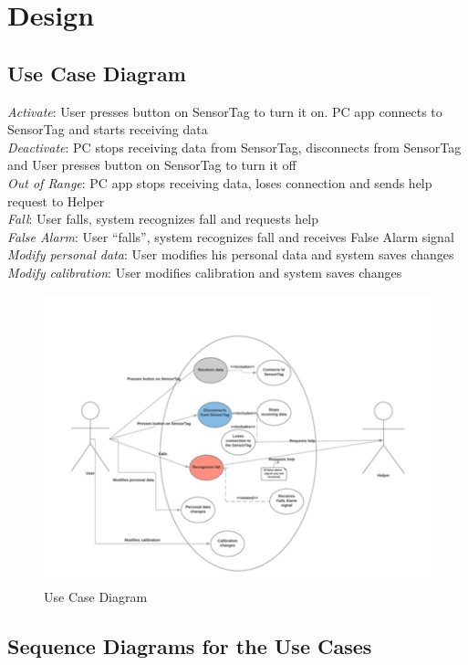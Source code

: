 \documentclass[conference,12pt]{IEEETran}
\begin{document}
\section{Design}
\subsection{Use Case Diagram}

\textit{Activate}: User presses button on SensorTag to turn it on. PC app connects to SensorTag and starts receiving data\\
\textit{Deactivate}: PC stops receiving data from SensorTag, disconnects from SensorTag and User presses button on SensorTag to turn it off\\
\textit{Out of Range}: PC app stops receiving data, loses connection and sends help request to Helper\\
\textit{Fall}: User falls, system recognizes fall and requests help\\
\textit{False Alarm}: User “falls”, system recognizes fall and receives False Alarm signal\\
\textit{Modify personal data}: User modifies his personal data and system saves changes\\
\textit{Modify calibration}:  User modifies calibration and system saves changes\\
\FloatBarrier
\begin{figure}[!h]
	\centering
	\includegraphics[scale=0.8]{images/Use_Case_Diag.png}
	\caption{Use Case Diagram\textsuperscript{\cite{umlspec}}}
	\label{img:Use_Diag}
\end{figure}
\FloatBarrier

\subsection{Sequence Diagrams for the Use Cases}
\end{document}
